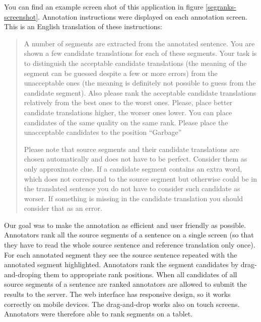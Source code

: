 You can find an example screen shot of this application in figure
\ref{segranks-screenshot}. Annotation instructions were displayed on each
annotation screen. This is an English translation of these instructions:

\begin{quote}
A number of segments are extracted from the annotated sentence. You are shown a
few candidate translations for each of these segments. Your task is to
distinguish the acceptable candidate translations (the meaning of the segment
can be guessed despite a few or more errors) from the unacceptable ones (the
meaning is definitely not possible to guess from the candidate segment). Also
please rank the acceptable candidate translations relatively from the best ones
to the worst ones.  Please, place better candidate translations higher, the
worser ones lower. You can place candidates of the same quality on the same
rank. Please place the unacceptable candidates to the position ``Garbage''

Please note that source segments and their candidate translations are chosen
automatically and does not have to be perfect. Consider them as only
approximate clue. If a candidate segment contains an extra word, which does not
correspond to the source segment but otherwise could be in the translated
sentence you do not have to consider such candidate as worser. If something is
missing in the candidate translation you should consider that as an error.
\end{quote}

Our goal was to make the annotation as efficient and user friendly as possible.
Annotators rank all the source segments of a sentence on a single screen (so
that they have to read the whole source sentence and reference translation only
once). For each annotated segment they see the source sentence repeated with
the annotated segment highlighted. Annotators rank the segment candidates by
drag-and-droping them to appropriate rank positions. When all candidates of all
source segments of a sentence are ranked annotators are allowed to submit the
results to the server.  The web interface has responsive design, so it works
correctly on mobile devices.  The drag-and-drop works also on touch screens.
Annotators were therefore able to rank segments on a tablet.

